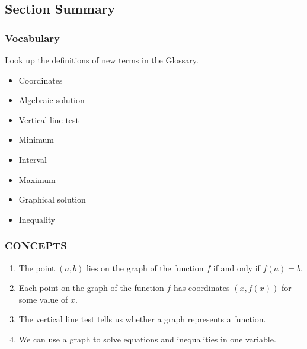 \documentclass[10pt,]{book}
\theoremstyle{plain}
\theoremstyle{definition}
\theoremstyle{definition}
\theoremstyle{definition}
\theoremstyle{definition}
\numberwithin{equation}{part}
\begin{document}
\subsection[{Section Summary}]{Section Summary}\label{summary-1-3}
\typeout{************************************************}
\typeout{************************************************}
\subsubsection[{Vocabulary}]{Vocabulary}\label{subsubsection-9}
Look up the definitions of new terms in the Glossary. \leavevmode%
\begin{multicols}{3}
\begin{itemize}[label=\textbullet]
\item{}Coordinates%
\item{}Algebraic solution%
\item{}Vertical line test%
\item{}Minimum%
\item{}Interval%
\item{}Maximum%
\item{}Graphical solution%
\item{}Inequality%
\end{itemize}
\end{multicols}
%
\typeout{************************************************}
\typeout{************************************************}
\subsubsection[{CONCEPTS}]{CONCEPTS}\label{subsubsection-10}
\leavevmode%
\begin{enumerate}[label=\arabic*]
\item\hypertarget{li-640}{}The point \((a, b)\) lies on the graph of the function \(f\) if and only if \(f (a) = b\).%
\item\hypertarget{li-641}{}Each point on the graph of the function \(f\) has coordinates \((x, f (x))\) for some value of \(x\).%
\item\hypertarget{li-642}{}The vertical line test tells us whether a graph represents a function.%
\item\hypertarget{li-643}{}We can use a graph to solve equations and inequalities in one variable.%
\end{enumerate}
%
\typeout{************************************************}
\typeout{************************************************}
\end{document}
